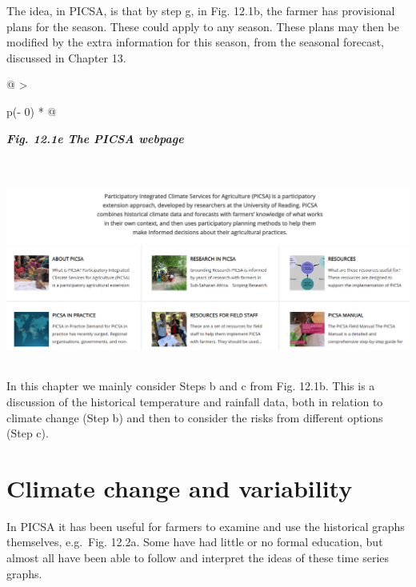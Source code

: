\documentclass[
  letterpaper,
  DIV=11,
  numbers=noendperiod]{scrreprt}
\begin{document}
The idea, in PICSA, is that by step g, in Fig. 12.1b, the farmer has
provisional plans for the season. These could apply to any season. These
plans may then be modified by the extra information for this season,
from the seasonal forecast, discussed in Chapter 13.

\begin{longtable}[]{@{}
  >{\raggedright\arraybackslash}p{(\columnwidth - 0\tabcolsep) * }@{}}
\toprule\noalign{}
\begin{minipage}[b]{\linewidth}\raggedright
\textbf{\emph{Fig. 12.1e The PICSA webpage}}
\end{minipage} \\
\midrule\noalign{}
\endhead
\bottomrule\noalign{}
\endlastfoot
\includegraphics[width=6.07852in,height=2.47895in]{figures/Fig12.1e.png} \\
\end{longtable}

In this chapter we mainly consider Steps b and c from Fig. 12.1b. This
is a discussion of the historical temperature and rainfall data, both in
relation to climate change (Step b) and then to consider the risks from
different options (Step c).

\section{Climate change and
variability}\label{climate-change-and-variability}

In PICSA it has been useful for farmers to examine and use the
historical graphs themselves, e.g.~Fig. 12.2a. Some have had little or
no formal education, but almost all have been able to follow and
interpret the ideas of these time series graphs.
\end{document}

